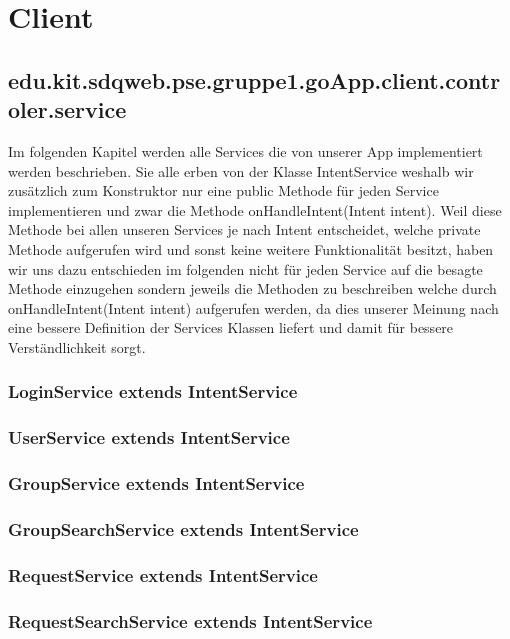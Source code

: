 
\section{Client} 
	\subsection{edu.kit.sdqweb.pse.gruppe1.goApp.client.controler.service}
	Im folgenden Kapitel werden alle Services die von unserer App implementiert werden beschrieben.
	Sie alle erben von der Klasse IntentService weshalb wir zusätzlich zum Konstruktor nur eine public Methode für jeden Service implementieren und zwar die Methode onHandleIntent(Intent intent).
	Weil diese Methode bei allen unseren Services je nach Intent entscheidet, welche private Methode aufgerufen wird und sonst keine weitere Funktionalität besitzt, haben wir uns dazu entschieden im folgenden nicht für jeden Service auf die besagte Methode einzugehen sondern jeweils die Methoden zu beschreiben welche durch onHandleIntent(Intent intent) aufgerufen werden, da dies unserer Meinung nach eine bessere Definition der Services Klassen liefert und damit für bessere Verständlichkeit sorgt. 
	\subsubsection {LoginService extends IntentService}
	\subsubsection {UserService extends IntentService}
	\subsubsection {GroupService extends IntentService}
	\subsubsection {GroupSearchService extends IntentService}
	\subsubsection {RequestService extends IntentService}
	\subsubsection {RequestSearchService extends IntentService}
